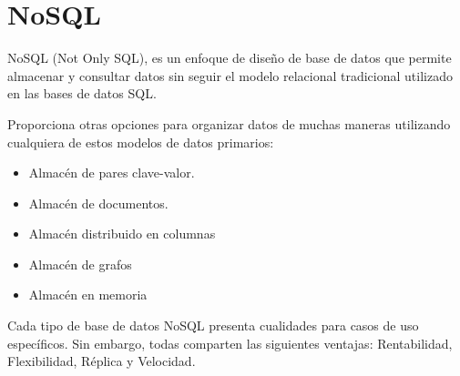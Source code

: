 \section{NoSQL}

NoSQL \cite{nosql} (Not Only SQL), es un enfoque de diseño de base de datos que permite almacenar y consultar datos sin seguir el modelo relacional tradicional utilizado en las bases de datos SQL.

Proporciona otras opciones para organizar datos de muchas maneras utilizando cualquiera de estos modelos de datos primarios: 
\begin{itemize}
\tightlist
    \item
        Almacén de pares clave-valor.
    \item 
        Almacén de documentos.
    \item 
        Almacén distribuido en columnas
    \item 
        Almacén de grafos
    \item 
        Almacén en memoria
\end{itemize}

Cada tipo de base de datos NoSQL presenta cualidades para casos de uso específicos. Sin embargo, todas comparten las siguientes ventajas: Rentabilidad, Flexibilidad, Réplica y Velocidad.
